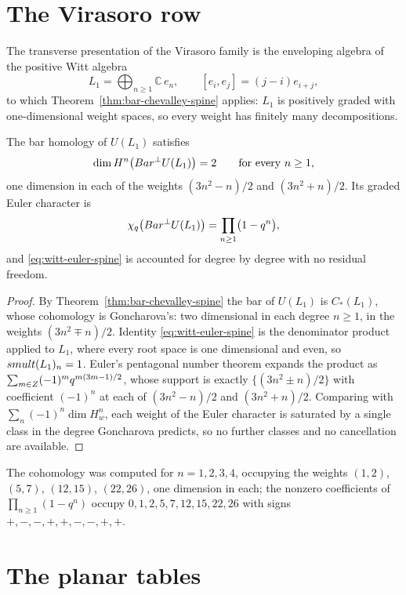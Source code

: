 \section{The Virasoro row}

The transverse presentation of the Virasoro family is the enveloping algebra of
the positive Witt algebra
\[
 L_1=\bigoplus_{n\ge1}\mathbb C\,e_n,
 \qquad
 [e_i,e_j]=(j-i)e_{i+j},
\]
to which Theorem~\ref{thm:bar-chevalley-spine} applies: $L_1$ is positively
graded with one-dimensional weight spaces, so every weight has finitely many
decompositions.

\begin{theorem}
\label{thm:pentagonal-spine}
The bar homology of $U(L_1)$ satisfies
\[
 \dim H^n\bigl(Bar^{\perp} U(L_1)\bigr)=2
 \qquad\text{for every }n\ge1,
\]
one dimension in each of the weights $(3n^2-n)/2$ and $(3n^2+n)/2$. Its graded
Euler character is
\begin{equation}
\label{eq:witt-euler-spine}
 \chi_q\bigl(Bar^{\perp} U(L_1)\bigr)=\prod_{n\ge1}\bigl(1-q^n\bigr),
\end{equation}
and \eqref{eq:witt-euler-spine} is accounted for degree by degree with no
residual freedom.
\end{theorem}
\begin{proof}
By Theorem~\ref{thm:bar-chevalley-spine} the bar of $U(L_1)$ is $C_*(L_1)$,
whose cohomology is Goncharova's: two dimensional in each degree $n\ge1$, in
the weights $(3n^2\mp n)/2$. Identity \eqref{eq:witt-euler-spine} is the
denominator product applied to $L_1$, where every root space is one dimensional
and even, so $smult(L_1)_n=1$. Euler's pentagonal number theorem expands the
product as $\sum_{m\in Z}(-1)^mq^{m(3m-1)/2}$, whose support is exactly
$\{(3n^2\pm n)/2\}$ with coefficient $(-1)^n$ at each of $(3n^2-n)/2$ and
$(3n^2+n)/2$. Comparing with $\sum_n(-1)^n\dim H^n_w$, each weight of the Euler
character is saturated by a single class in the degree Goncharova predicts, so
no further classes and no cancellation are available.
\end{proof}

The cohomology was computed for $n=1,2,3,4$, occupying the weights $(1,2)$,
$(5,7)$, $(12,15)$, $(22,26)$, one dimension in each; the nonzero coefficients
of $\prod_{n\ge1}(1-q^n)$ occupy $0,1,2,5,7,12,15,22,26$ with signs
$+,-,-,+,+,-,-,+,+$.

\section{The planar tables}

